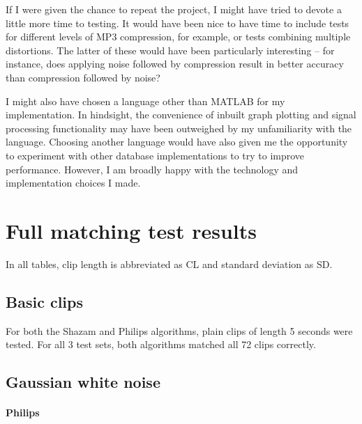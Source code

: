 \documentclass[12pt,a4paper,twoside,openright]{report}
\begin{document}
If I were given the chance to repeat the project, I might have tried to devote a little more time to testing. It would have been nice to have time to include tests for different levels of MP3 compression, for example, or tests combining multiple distortions. The latter of these would have been particularly interesting -- for instance, does applying noise followed by compression result in better accuracy than compression followed by noise?  

I might also have chosen a language other than MATLAB for my implementation. In hindsight, the convenience of inbuilt graph plotting and signal processing functionality may have been outweighed by my unfamiliarity with the language. Choosing another language would have also given me the opportunity to experiment with other database implementations to try to improve performance. However, I am broadly happy with the technology and implementation choices I made.





\appendix



\chapter{Full matching test results}

In all tables, clip length is abbreviated as CL and standard deviation as SD.


\section{Basic clips}

For both the Shazam and Philips algorithms, plain clips of length 5 seconds were tested. For all 3 test sets, both algorithms matched all 72 clips correctly.

\section{Gaussian white noise}

\subsubsection{Philips}
\end{document}
